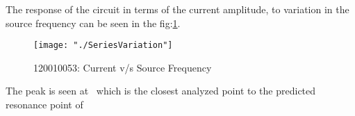 \documentclass[12pt, twosides]{article}
\newcommand{\rollno}{120010053}
\begin{document}
			The response of the circuit in terms of the current amplitude, to variation in the source frequency can be seen in the fig:\ref{fig:series variation}.
	
			\begin{figure}[H]
			\centering
				\texttt{[image: "./SeriesVariation"]}
			\caption{\rollno: Current v/s Source Frequency}
			\label{fig:series variation}
			\end{figure}	

			The peak is seen at \peakSer \  which is the closest analyzed point to the predicted resonance point of \resonSer

	
		
\end{document}
